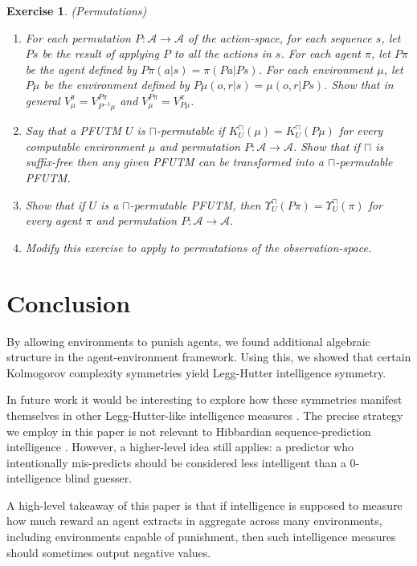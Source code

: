 \documentclass{article}
\newtheorem{exercise}[theorem]{Exercise}
\def\LH{\Upsilon}
\begin{document}
\begin{exercise} (Permutations)
    \begin{enumerate}
        \item
        For each permutation $P:\mathcal A\to\mathcal A$ of the action-space,
        for each sequence $s$,
        let $Ps$ be the result of applying $P$ to all the actions in $s$.
        For each agent $\pi$, let $P\pi$ be the agent defined by
        $P\pi(a|s)=\pi(Pa|Ps)$. For each environment $\mu$, let
        $P\mu$ be the environment defined by
        $P\mu(o,r|s)=\mu(o,r|Ps)$. Show that in general
        $V^\pi_\mu = V^{P\pi}_{P^{-1}\mu}$
        and
        $V^{P\pi}_\mu = V^\pi_{P\mu}$.
        \item
        Say that a PFUTM $U$ is \emph{$\sqcap$-permutable} if
        $K^\sqcap_U(\mu)=K^\sqcap_U(P\mu)$ for every computable environment $\mu$
        and permutation $P:\mathcal A\to\mathcal A$. Show that if $\sqcap$ is
        suffix-free then any given
        PFUTM can be transformed into a $\sqcap$-permutable PFUTM.
        \item
        Show that if $U$ is a $\sqcap$-permutable PFUTM,
        then $\LH^\sqcap_U(P\pi)=\LH^\sqcap_U(\pi)$
        for every agent $\pi$ and permutation $P:\mathcal A\to\mathcal A$.
        \item
        Modify this exercise to apply to permutations
        of the observation-space.
    \end{enumerate}
\end{exercise}

\section{Conclusion}
\label{conclusionsecn}

By allowing environments to punish agents,
we found additional algebraic structure in the agent-environment
framework. Using this, we showed
that certain Kolmogorov complexity symmetries yield
Legg-Hutter intelligence symmetry.

In future work it would be interesting to explore how these symmetries
manifest themselves in other Legg-Hutter-like intelligence measures
\cite{gavane} \cite{hernandez}.
The precise strategy we employ in this
paper is not relevant to Hibbardian sequence-prediction intelligence
\cite{hibbard} \cite{alexander2021measuring}. However, a higher-level
idea still applies:
a predictor who intentionally mis-predicts
should be considered less intelligent than a $0$-intelligence blind guesser.

A high-level takeaway of
this paper is that if intelligence is supposed to measure how much
reward an agent extracts in aggregate across many environments,
including environments capable of punishment, then such
intelligence measures should sometimes output negative
values.




\end{document}
